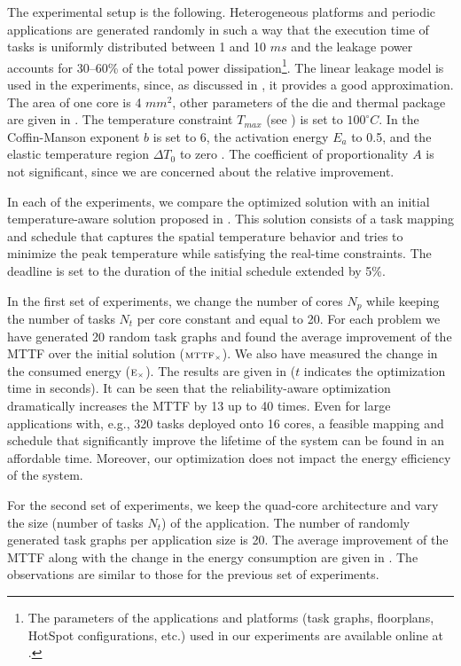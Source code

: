 The experimental setup is the following. Heterogeneous platforms and periodic applications are generated randomly \cite{dick1998} in such a way that the execution time of tasks is uniformly distributed between 1 and 10 $ms$ and the leakage power accounts for 30--60\% of the total power dissipation\footnote{The parameters of the applications and platforms (task graphs, floorplans, HotSpot configurations, etc.) used in our experiments are available online at \cite{liu2011}.}. The linear leakage model is used in the experiments, since, as discussed in , it provides a good approximation. The area of one core is 4 $mm^2$, other parameters of the die and thermal package are given in . The temperature constraint $T_{max}$ (see ) is set to $100^\circ C$. In  the Coffin-Manson exponent $b$ is set to 6, the activation energy $E_a$ to 0.5, and the elastic temperature region $\Delta T_0$ to zero \cite{jedec2010}. The coefficient of proportionality $A$ is not significant, since we are concerned about the relative improvement.

In each of the experiments, we compare the optimized solution with an initial temperature-aware solution proposed in \cite{xie2006}. This solution consists of a task mapping and schedule that captures the spatial temperature behavior and tries to minimize the peak temperature while satisfying the real-time constraints. The deadline is set to the duration of the initial schedule extended by 5\%.

In the first set of experiments, we change the number of cores $N_p$ while keeping the number of tasks $N_t$ per core constant and equal to 20. For each problem we have generated 20 random task graphs and found the average improvement of the MTTF over the initial solution ($\scriptstyle \text{MTTF}_\times$). We also have measured the change in the consumed energy ($\scriptstyle \text{E}_\times$). The results are given in  ($t$ indicates the optimization time in seconds). It can be seen that the reliability-aware optimization dramatically increases the MTTF by 13 up to 40 times. Even for large applications with, e.g., 320 tasks deployed onto 16 cores, a feasible mapping and schedule that significantly improve the lifetime of the system can be found in an affordable time. Moreover, our optimization does not impact the energy efficiency of the system.

For the second set of experiments, we keep the quad-core architecture and vary the size (number of tasks $N_t$) of the application. The number of randomly generated task graphs per application size is 20. The average improvement of the MTTF along with the change in the energy consumption are given in . The observations are similar to those for the previous set of experiments.

